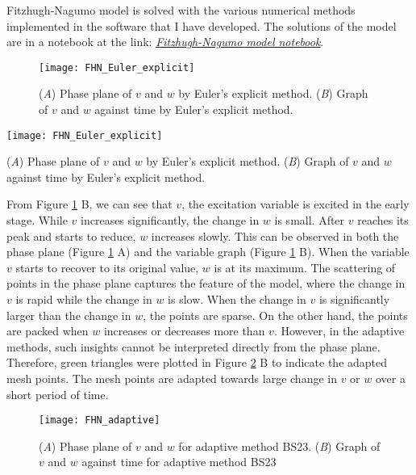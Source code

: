 Fitzhugh-Nagumo model is solved with the various numerical methods implemented in the software that I have developed. The solutions of the model are in a notebook at the link:  \href{https://nbviewer.jupyter.org/github/FarmHJ/numerical-solver/blob/main/examples/fitzhugh_nagumo.ipynb}{\underline{\emph{Fitzhugh-Nagumo model notebook}}}. 

\begin{figure}
    \texttt{[image: FHN\_Euler\_explicit]}
    \caption{(\textit{A}) Phase plane of $v$ and $w$ by Euler's explicit method. (\textit{B}) Graph of $v$ and $w$ against time by Euler's explicit method.}
    \label{fig:FHN_Euler_explicit}
\end{figure}

\begin{center}
    \texttt{[image: FHN\_Euler\_explicit]}
    \caption{(\textit{A}) Phase plane of $v$ and $w$ by Euler's explicit method. (\textit{B}) Graph of $v$ and $w$ against time by Euler's explicit method.}
    \label{fig:FHN_Euler_explicit}
\end{center}

From Figure \ref{fig:FHN_Euler_explicit} B, we can see that $v$, the excitation variable is excited in the early stage. While $v$ increases significantly, the change in $w$ is small. After $v$ reaches its peak and starts to reduce, $w$ increases slowly. This can be observed in both the phase plane (Figure \ref{fig:FHN_Euler_explicit} A) and the variable graph (Figure \ref{fig:FHN_Euler_explicit} B). When the variable $v$ starts to recover to its original value, $w$ is at its maximum. The scattering of points in the phase plane captures the feature of the model, where the change in $v$ is rapid while the change in $w$ is slow. When the change in $v$ is significantly larger than the change in $w$, the points are sparse. On the other hand, the points are packed when $w$ increases or decreases more than $v$. However, in the adaptive methods, such insights cannot be interpreted directly from the phase plane. Therefore, green triangles were plotted in Figure \ref{fig:FHN_adaptive} B to indicate the adapted mesh points. The mesh points are adapted towards large change in $v$ or $w$ over a short period of time.

\begin{figure}
    \texttt{[image: FHN\_adaptive]}
    \caption{(\textit{A}) Phase plane of $v$ and $w$ for adaptive method BS23. (\textit{B}) Graph of $v$ and $w$ against time for adaptive method BS23}
    \label{fig:FHN_adaptive}
\end{figure}

